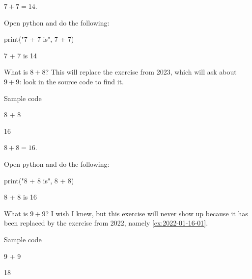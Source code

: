 \documentclass[oneside]{book}
\begin{document}
\begin{solution}
  \(7 + 7 = 14\).
\end{solution}

\begin{additionalinformation}
Open python and do the following:

\begin{pycell}
print("7 + 7 is", 7 + 7)
\end{pycell}
\begin{pyexpectedoutput}
7 + 7 is 14
\end{pyexpectedoutput}
\end{additionalinformation}

\begin{exercise}[examdate={January 16, 2022}, examproblemnumber={1}, examproblemid={2022-01-16-01}]
  What is \(8 + 8\)? This will replace the exercise from 2023, which will ask about \(9 + 9\): look in the source code to find it.

Sample code
\begin{pycell}
8 + 8
\end{pycell}
\begin{pyexpectedoutput}
16
\end{pyexpectedoutput}
\end{exercise}

\begin{solution}
  \(8 + 8 = 16\).
\end{solution}

\begin{additionalinformation}
Open python and do the following:

\begin{pycell}
print("8 + 8 is", 8 + 8)
\end{pycell}
\begin{pyexpectedoutput}
8 + 8 is 16
\end{pyexpectedoutput}
\end{additionalinformation}

\begin{exercise}[examdate={January 16, 2023}, examproblemnumber={1}, examproblemid={2023-01-16-01}, replacedbyexamproblemid={2022-01-16-01}, replacementsinceacademicyear={2025/2026}]
  What is \(9 + 9\)? I wish I knew, but this exercise will never show up because it has been replaced by the exercise from 2022, namely \cref{ex:2022-01-16-01}.

Sample code
\begin{pycell}
9 + 9
\end{pycell}
\begin{pyexpectedoutput}
18
\end{pyexpectedoutput}
\end{exercise}
\end{document}
